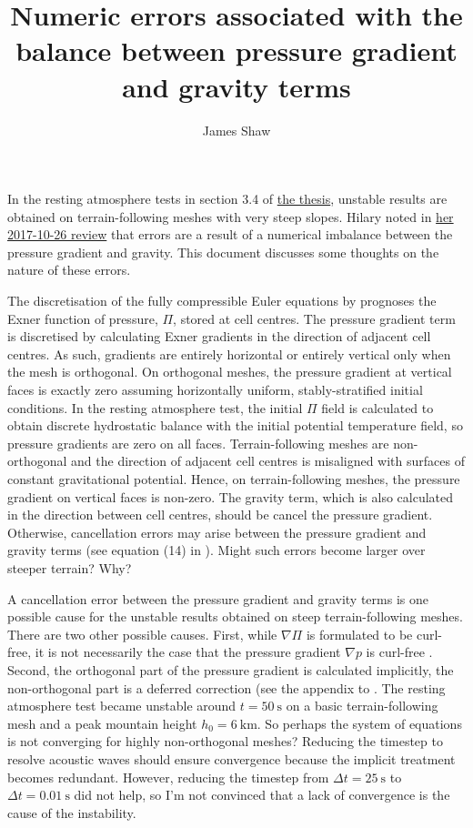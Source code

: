 \documentclass{article}
\title{Numeric errors associated with the balance between pressure gradient and gravity terms}
\author{James Shaw}
\newcommand{\Exner}{\Pi}
\begin{document}
\maketitle
In the resting atmosphere tests in section 3.4 of \href{http://datumedge.co.uk/publications/phd-thesis.pdf}{the thesis}, unstable results are obtained on terrain-following meshes with very steep slopes.  Hilary noted in \href{https://github.com/hertzsprung/thesis/blob/master/src/thesis-reviews/weller-2017-10-26.ps.gz}{her 2017-10-26 review} that errors are a result of a numerical imbalance between the pressure gradient and gravity.  This document discusses some thoughts on the nature of these errors.

The discretisation of the fully compressible Euler equations by \citet{weller-shahrokhi2014} prognoses the Exner function of pressure, $\Exner$, stored at cell centres.
The pressure gradient term is discretised by calculating Exner gradients in the direction of adjacent cell centres.  As such, gradients are entirely horizontal or entirely vertical only when the mesh is orthogonal.
On orthogonal meshes, the pressure gradient at vertical faces is exactly zero assuming horizontally uniform, stably-stratified initial conditions.
In the resting atmosphere test, the initial $\Exner$ field is calculated to obtain discrete hydrostatic balance with the initial potential temperature field, so pressure gradients are zero on all faces.
Terrain-following meshes are non-orthogonal and the direction of adjacent cell centres is misaligned with surfaces of constant gravitational potential.
Hence, on terrain-following meshes, the pressure gradient on vertical faces is non-zero.
The gravity term, which is also calculated in the direction between cell centres, should be cancel the pressure gradient.  Otherwise, cancellation errors may arise between the pressure gradient and gravity terms (see equation (14) in \citet{weller-shahrokhi2014}).  Might such errors become larger over steeper terrain? Why?

A cancellation error between the pressure gradient and gravity terms is one possible cause for the unstable results obtained on steep terrain-following meshes.  There are two other possible causes.  First, while $\nabla \Exner$ is formulated to be curl-free, it is not necessarily the case that the pressure gradient $\nabla p$ is curl-free \citep{weller-shahrokhi2014}.
Second, the orthogonal part of the pressure gradient is calculated implicitly, the non-orthogonal part is a deferred correction (see the appendix to \citet{shaw-weller2016}.
The resting atmosphere test became unstable around $t = \SI{50}{\second}$ on a basic terrain-following mesh and a peak mountain height $h_0 = \SI{6}{\kilo\meter}$.
So perhaps the system of equations is not converging for highly non-orthogonal meshes?  Reducing the timestep to resolve acoustic waves should ensure convergence because the implicit treatment becomes redundant.  However, reducing the timestep from $\Delta t = \SI{25}{\second}$ to $\Delta t = \SI{0.01}{\second}$ did not help, so I'm not convinced that a lack of convergence is the cause of the instability.



\end{document}
